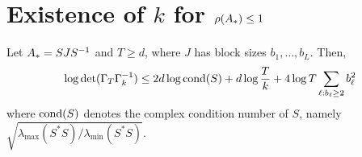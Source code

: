\section{Existence of $k$ for $\rho(A_{*}) \leq 1$\label{app:consistent}}
\label{sec:appendix:kst}

\begin{prop}\label{prop:det_bound} Let $A_{*} = SJS^{-1}$ and $T \ge d$, where $J$ has block sizes $b_{1},\dots,b_L$. Then,
\begin{eqnarray} 
 \log \det(\Gamma_T \Gamma_{k}^{-1}) \le 2d\log \mathrm{cond}(S) + d \log \frac{T}{k} +  4\log T \sum_{\ell: b_{\ell} \ge 2} b_{\ell}^2 
\end{eqnarray}
where $\mathrm{cond}(S)$ denotes the complex condition number of $S$, namely $\sqrt{\lambda_{\max}(S^*S)/\lambda_{\min}(S^*S)}$.
\end{prop}




